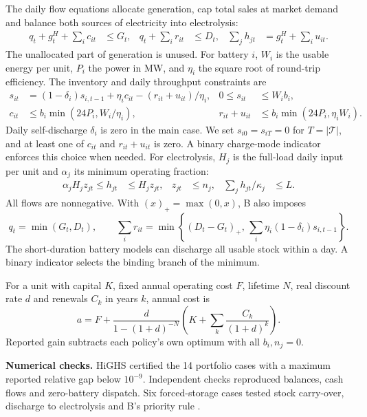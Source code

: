 The daily flow equations allocate generation, cap total sales at market
demand and balance both sources of electricity into electrolysis:
\begin{align}
 q_t+g_t^H+\sum_i c_{it}&\le G_t, &
 q_t+\sum_i r_{it}&\le D_t, &
 \sum_j h_{jt}&=g_t^H+\sum_i u_{it}. \label{eq:flow}
\end{align}
The unallocated part of generation is unused. For battery \(i\), \(W_i\)
is the usable energy per unit, \(P_i\) the power in MW, and \(\eta_i\)
the square root of round-trip efficiency. The inventory and daily throughput
constraints are
\begin{align}
s_{it}&=(1-\delta_i)s_{i,t-1}+\eta_i c_{it}-(r_{it}+u_{it})/\eta_i,
 & 0\le s_{it}&\le W_i b_i, \label{eq:stock}\\
c_{it}&\le b_i\min(24P_i,W_i/\eta_i),
 & r_{it}+u_{it}&\le b_i\min(24P_i,\eta_i W_i). \label{eq:window}
\end{align}
Daily self-discharge \(\delta_i\) is zero in the main case. We set
\(s_{i0}=s_{iT}=0\) for \(T=|\mathcal T|\), and at least one of \(c_{it}\)
and \(r_{it}+u_{it}\) is zero. A binary charge-mode indicator enforces
this choice when needed. For electrolysis, \(H_j\) is the full-load daily
input per unit and \(\alpha_j\) its minimum operating fraction:
\begin{align}
\alpha_j H_j z_{jt}\le h_{jt}&\le H_j z_{jt}, &
z_{jt}&\le n_j, &
\sum_j h_{jt}/\kappa_j&\le L. \label{eq:hydrogen}
\end{align}
All flows are nonnegative. With \((x)_+=\max(0,x)\), B also imposes
\begin{equation}
q_t=\min(G_t,D_t), \qquad
\sum_i r_{it}=\min\!\left\{(D_t-G_t)_+,\,
            \sum_i\eta_i(1-\delta_i)s_{i,t-1}\right\}.
\label{eq:priority}
\end{equation}
The short-duration battery models can discharge all usable stock within
a day. A binary indicator selects the binding branch of the minimum.

For a unit with capital \(K\), fixed annual operating cost \(F\), lifetime
\(N\), real discount rate \(d\) and renewals \(C_k\) in years \(k\),
annual cost is
\begin{equation}
a=F+\frac{d}{1-(1+d)^{-N}}
\left(K+\sum_k\frac{C_k}{(1+d)^k}\right).
\label{eq:annualcost}
\end{equation}
Reported gain subtracts each policy's own optimum with all \(b_i,n_j=0\).

\textbf{Numerical checks.}
HiGHS certified the 14 portfolio cases with a maximum reported relative
gap below \(10^{-9}\). Independent checks reproduced balances, cash
flows and zero-battery dispatch. Six forced-storage cases tested stock
carry-over, discharge to electrolysis and B's priority rule \cite{v6}.

